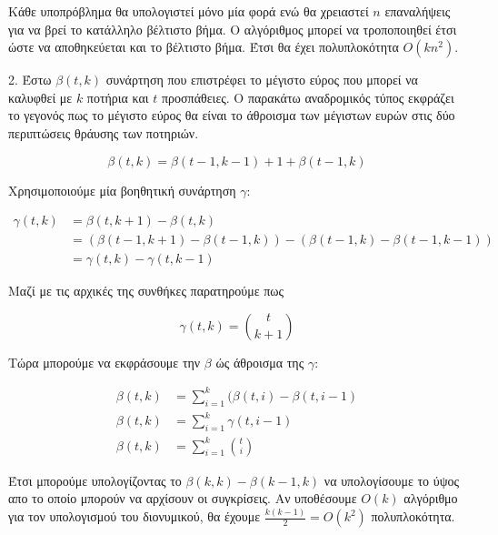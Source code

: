        Κάθε υποπρόβλημα θα υπολογιστεί μόνο μία φορά ενώ θα χρειαστεί $n$ επαναλήψεις για να βρεί το κατάλληλο βέλτιστο βήμα.
       Ο αλγόριθμος μπορεί να τροποποιηθεί έτσι ώστε να αποθηκεύεται και το βέλτιστο βήμα.
       Έτσι θα έχει πολυπλοκότητα $O(kn^2)$.

\newpage

    2. Έστω $\beta(t,k)$ συνάρτηση που επιστρέφει το μέγιστο εύρος που μπορεί να καλυφθεί με $k$ ποτήρια και $t$ προσπάθειες.
    Ο παρακάτω αναδρομικός τύπος εκφράζει το γεγονός πως το μέγιστο εύρος θα είναι το άθροισμα των μέγιστων ευρών στις δύο περιπτώσεις θράυσης
    των ποτηριών. 

    $$ \beta(t,k) = \beta(t-1, k-1) + 1 + \beta(t-1, k) $$

    Χρησιμοποιούμε μία βοηθητική συνάρτηση $\gamma$:

    \begin{align*}
        \gamma(t, k) &= \beta(t,k+1) - \beta(t, k)\\
                     &= (\beta(t-1,k+1)-\beta(t-1,k)) - (\beta(t-1, k)-\beta(t-1,k-1))\\
                     &= \gamma(t,k) - \gamma(t,k-1)
    \end{align*}
    
    Μαζί με τις αρχικές της συνθήκες παρατηρούμε πως

    $$\gamma(t,k) = \binom{t}{k+1}$$

    Τώρα μπορούμε να εκφράσουμε την $\beta$ ώς άθροισμα της $\gamma$:

    \begin{align*}
        \beta(t,k) &= \sum_{i=1}^{k} (\beta(t,i) - \beta(t,i-1) \\
        \beta(t,k) &= \sum_{i=1}^{k} \gamma(t,i-1) \\
        \beta(t,k) &= \sum_{i=1}^{k} \binom{t}{i}
    \end{align*}

    Έτσι μπορούμε υπολογίζοντας το $\beta(k,k) - \beta(k-1,k)$ να υπολογίσουμε το ύψος απο το οποίο μπορούν να αρχίσουν οι συγκρίσεις.
    Αν υποθέσουμε $O(k)$ αλγόριθμο για τον υπολογισμού του διονυμικού, θα έχουμε $\frac{k(k-1)}{2} = O(k^2)$ πολυπλοκότητα. 


    

